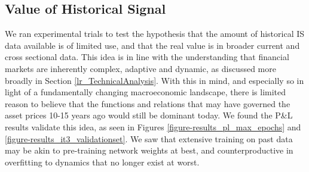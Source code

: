 \documentclass[a4paper,11pt,oneside]{article}
\theoremstyle{plain}
\theoremstyle{definition}
\begin{document}
\begin{figure}[H]
			\label{figure_ogdlr_delta_encoding_groups}
		\end{figure}
		
		
		
		
		\newpage

	\subsection{Value of Historical Signal}\label{results_data_hist}
		
	We ran experimental trials to test the hypothesis that the amount of historical IS data available is of limited use, and that the real value is in broader current and cross sectional data. This idea is in line with the understanding that financial markets are inherently complex, adaptive and dynamic, as discussed more broadly in Section \ref{lr_TechnicalAnalysis}. With this in mind, and especially so in light of a fundamentally changing macroeconomic landscape, there is limited reason to believe that the functions and relations that may have governed the asset prices 10-15 years ago would still be dominant today. We found the P\&L results validate this idea, as seen in Figures \ref{figure-results_pl_max_epochs} and \ref{figure-results_it3_validationset}. We saw that extensive training on past data may be akin to pre-training network weights at best, and counterproductive in overfitting to dynamics that no longer exist at worst.
	
\end{document}
